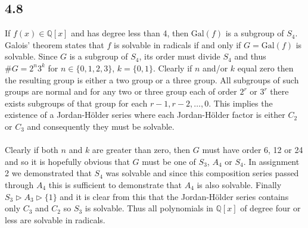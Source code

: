 \documentclass{article}
\begin{document}
\subsection*{4.8}
If $f(x) \in \mathbb{Q}[x]$ and has degree less than 4, then $\text{Gal}(f)$ is a subgroup of 
$S_4$. Galois' theorem states that $f$ is solvable in radicals if and only if $G = \text{Gal}(f)$ 
is solvable. Since $G$ is a subgroup of $S_4$, its order must divide $S_4$ and thus $\#G = 2^n3^k$ 
for $n \in \{0,1,2,3\}$, $k = \{0,1\}$. Clearly if $n$ and/or $k$ equal zero then the resulting 
group is either a two group or a three group. All subgroups of such groups are normal and for 
any two or three group each of order $2^r$ or $3^r$ there exists subgroups of that group for each $r-1,r-2,\dots,0$. 
This implies the existence of a Jordan-H{\"o}lder series where each Jordan-H{\"o}lder factor is 
either $C_2$ or $C_3$ and consequently they must be solvable.

\paragraph{}
Clearly if both $n$ and $k$ are greater than zero, then $G$ must have order 6, 12 or 24 and so it is hopefully obvious that $G$ must be 
one of $S_3$, $A_4$ or $S_4$. In assignment 2 we demonstrated that $S_4$ was solvable and since 
this composition series passed through $A_4$ this is sufficient to demonstrate that $A_4$ is 
also solvable. Finally $S_3 \triangleright A_3 \triangleright \{1\}$ and it is clear from 
this that the Jordan-H{\"o}lder series contains only $C_3$ and $C_2$ so $S_3$ is solvable. Thus all polynomials in $\mathbb{Q}[x]$ of degree four or less are 
solvable in radicals.
\end{document}
